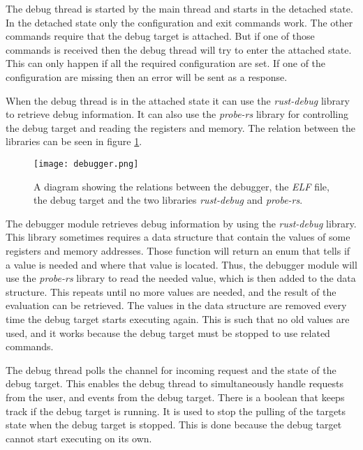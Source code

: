 The debug thread is started by the main thread and starts in the detached state.
In the detached state only the configuration and exit commands work.
The other commands require that the debug target is attached.
But if one of those commands is received then the debug thread will try to enter the attached state.
This can only happen if all the required configuration are set.
If one of the configuration are missing then an error will be sent as a response.


When the debug thread is in the attached state it can use the \emph{rust-debug} library to retrieve debug information.
It can also use the \emph{probe-rs} library for controlling the debug target and reading the registers and memory.
The relation between the libraries can be seen in figure \ref{fig:debugger}.


\begin{figure}[h]
	\centering
	\texttt{[image: debugger.png]}
	\caption{A diagram showing the relations between the debugger, the \emph{ELF} file, the debug target and the two libraries \emph{rust-debug} and \emph{probe-rs}.}
	\label{fig:debugger}
\end{figure}


The debugger module retrieves debug information by using the \emph{rust-debug} library.
This library sometimes requires a data structure that contain the values of some registers and memory addresses.
Those function will return an enum that tells if a value is needed and where that value is located.
Thus, the debugger module will use the \emph{probe-rs} library to read the needed value, which is then added to the data structure.
This repeats until no more values are needed, and the result of the evaluation can be retrieved.
The values in the data structure are removed every time the debug target starts executing again.
This is such that no old values are used, and it works because the debug target must be stopped to use related commands.



The debug thread polls the channel for incoming request and the state of the debug target.
This enables the debug thread to simultaneously handle requests from the user, and events from the debug target.
There is a boolean that keeps track if the debug target is running.
It is used to stop the pulling of the targets state when the debug target is stopped.
This is done because the debug target cannot start executing on its own.


